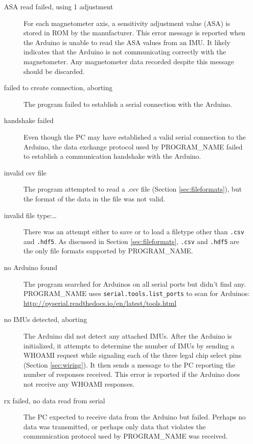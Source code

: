 \documentclass[11pt,letterpaper,article,oneside]{memoir}
\newcommand{\name}{PROGRAM\_NAME}
\newcommand{\csv}{\texttt{.csv}}
\newcommand{\hdf}{\texttt{.hdf5}}
\begin{document}
\begin{description}

\item[ASA read failed, using 1 adjustment]
For each magnetometer axis, a sensitivity adjustment value (ASA) is stored in
ROM by the manufacturer.  This error message is reported when the Arduino is
unable to read the ASA values from an IMU.  It likely indicates that the Arduino
is not communicating correctly with the magnetometer.  Any magnetometer data
recorded despite this message should be discarded.
\genericFix{}

\item[failed to create connection, aborting]
The program failed to establish a serial connection with the Arduino.
\genericFix{}

\item[handshake failed]
Even though the PC may have established a valid serial connection to the
Arduino, the data exchange protocol used by \name{} failed to establish a
communication handshake with the Arduino.
\genericFix{}

\item[invalid csv file]
The program attempted to read a .csv file (Section \ref{sec:fileformats}), but
the format of the data in the file was not valid.

\item[invalid file type:\ldots]
There was an attempt either to save or to load a filetype other than
\csv{} and \hdf{}. As discussed in Section \ref{sec:fileformats},
\csv{} and \hdf{} are the only file formats supported by \name.

\item[no Arduino found]
The program searched for Arduinos on all serial ports but didn't find any.
\name{} uses \texttt{serial.tools.list\_ports} to scan for Arduinos:
\url{http://pyserial.readthedocs.io/en/latest/tools.html}

\item[no IMUs detected, aborting]
The Arduino did not detect any attached IMUs.  After the Arduino is initialized,
it attempts to determine the number of IMUs by sending a WHOAMI request while
signaling each of the three legal chip select pins (Section \ref{sec:wiring}).
It then sends a message to the PC reporting the number of responses received. This
error is reported if the Arduino does not receive any WHOAMI responses.
\genericFix{}

\item[rx failed, no data read from serial]
The PC expected to receive data from the Arduino but failed. Perhaps no data was
transmitted, or perhaps only data that violates the communication protocol used
by \name{} was received.
\genericFix{}


\end{description}
\end{document}
